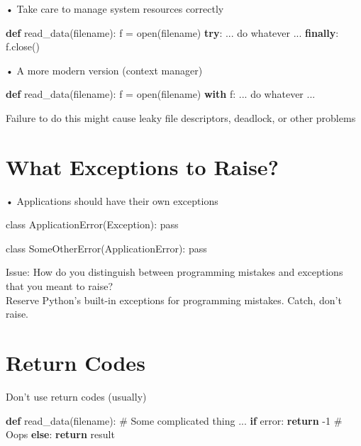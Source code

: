 \documentclass[
  letterpaper,
  DIV=11,
  numbers=noendperiod]{scrreprt}
\newenvironment{Shaded}{\begin{snugshade}}{\end{snugshade}}
\newcommand{\BuiltInTok}[1]{\textcolor[rgb]{0.00,0.23,0.31}{#1}}
\newcommand{\CommentTok}[1]{\textcolor[rgb]{0.37,0.37,0.37}{#1}}
\newcommand{\ControlFlowTok}[1]{\textcolor[rgb]{0.00,0.23,0.31}{\textbf{#1}}}
\newcommand{\DecValTok}[1]{\textcolor[rgb]{0.68,0.00,0.00}{#1}}
\newcommand{\KeywordTok}[1]{\textcolor[rgb]{0.00,0.23,0.31}{\textbf{#1}}}
\newcommand{\NormalTok}[1]{\textcolor[rgb]{0.00,0.23,0.31}{#1}}
\newcommand{\OperatorTok}[1]{\textcolor[rgb]{0.37,0.37,0.37}{#1}}
\begin{document}
• Take care to manage system resources correctly

\begin{Shaded}
\begin{Highlighting}[]
\KeywordTok{def}\NormalTok{ read\_data(filename):}
\NormalTok{    f }\OperatorTok{=} \BuiltInTok{open}\NormalTok{(filename)}
    \ControlFlowTok{try}\NormalTok{:}
\NormalTok{        ... do whatever ...}
    \ControlFlowTok{finally}\NormalTok{:}
\NormalTok{        f.close() }
\end{Highlighting}
\end{Shaded}

• A more modern version (context manager)

\begin{Shaded}
\begin{Highlighting}[]
\KeywordTok{def}\NormalTok{ read\_data(filename):}
\NormalTok{    f }\OperatorTok{=} \BuiltInTok{open}\NormalTok{(filename)}
    \ControlFlowTok{with}\NormalTok{ f:}
\NormalTok{        ... do whatever ... }
\end{Highlighting}
\end{Shaded}

Failure to do this might cause leaky file descriptors, deadlock, or
other problems


\chapter{What Exceptions to Raise?}\label{what-exceptions-to-raise}

• Applications should have their own exceptions

class ApplicationError(Exception): pass

class SomeOtherError(ApplicationError): pass

Issue: How do you distinguish between programming mistakes and
exceptions that you meant to raise?\\
Reserve Python's built-in exceptions for programming mistakes. Catch,
don't raise.


\chapter{Return Codes}\label{return-codes}

Don't use return codes (usually)

\begin{Shaded}
\begin{Highlighting}[]
\KeywordTok{def}\NormalTok{ read\_data(filename):}
    \CommentTok{\# Some complicated thing}
\NormalTok{    ...}
    \ControlFlowTok{if}\NormalTok{ error:}
        \ControlFlowTok{return} \OperatorTok{{-}}\DecValTok{1}  \CommentTok{\# Oops}
    \ControlFlowTok{else}\NormalTok{:}
        \ControlFlowTok{return}\NormalTok{ result }
\end{Highlighting}
\end{Shaded}
\end{document}
